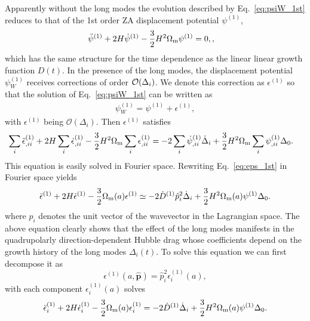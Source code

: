 \documentclass[a4paper,11pt]{article}
\newcommand{\vp}{{\bm p}}
\begin{document}
Apparently without the long modes the evolution described by Eq.~\eqref{eq:psiW_1st} reduces to
that of the 1st order ZA displacement potential $\psi^{(1)}$,
\begin{align}
    \ddot{\psi}^{(1)} + 2H\dot{\psi}^{(1)} - \frac{3}{2}H^2\Omega_{\rm m}\psi^{(1)} &= 0,
    \label{eq:psi_1st},
\end{align}
which has the same structure for the time dependence as the linear linear growth function $D(t)$.
In the presence of the long modes, the displacement potential $\psi^{(1)}_W$
receives corrections of order ${\cal O}(\Delta_i)$.
We denote this correction as $\epsilon^{(1)}$ so that the solution of Eq.~\eqref{eq:psiW_1st} can be written as 
\begin{align}
\psi_{W}^{(1)} = \psi^{(1)} + \epsilon^{(1)},
\end{align}
with $\epsilon^{(1)}$ being $\mathcal{O}(\Delta_i)$.
Then $\epsilon^{(1)}$ satisfies
\begin{align}
    \sum_i \ddot{\epsilon}^{(1)}_{,ii} + 2H\sum_i \dot{\epsilon}^{(1)}_{,ii} - \frac{3}{2}H^2\Omega_{\rm m}\sum_i \epsilon^{(1)}_{,ii} &= -2\sum_i \dot{\psi}_{,ii}^{(1)}\dot{\Delta}_i 
    + \frac{3}{2}H^2\Omega_{\rm m}\sum_i \psi_{,ii}^{(1)}\Delta_0.
    \label{eq:eps_1st}
\end{align}
This equation is easily solved in Fourier space.
Rewriting Eq.~\eqref{eq:eps_1st} in Fourier space yields
\begin{equation}
    \ddot \epsilon^{(1)} +2H \dot \epsilon^{(1)}
    - \frac32 \Omega_{\rm m}(a) \epsilon^{(1)}
    \simeq
    - 2\dot D^{(1)} \hat p_i^2 \dot \Delta_i + \frac32 H^2 \Omega_{\rm m}(a) \psi^{(1)} \Delta_0.
\end{equation}
where $\hat p_i$ denotes the unit vector of the wavevector
in the Lagrangian space.
The above equation clearly shows that the effect of the long modes manifests in the quadrupolarly
direction-dependent Hubble drag whose coefficients depend on the growth
history of the long modes $\Delta_i(t)$.
To solve this equation we can first decompose it as
\begin{equation}
    \epsilon^{(1)}(a, \hat{\vp}) = \hat p_i^2 \epsilon^{(1)}_i(a),
    \label{e}
\end{equation}
with each component $\epsilon^{(1)}_i(a)$ solves
\begin{equation}
    \ddot \epsilon_i^{(1)} + 2H \dot \epsilon_i^{(1)}
    - \frac32 \Omega_{\rm m}(a)\epsilon_i^{(1)}
    = - 2 \dot D^{(1)} \dot \Delta_i + \frac32 H^2\Omega_{\rm m}(a) \psi^{(1)} \Delta_0.
    \label{eq:ei}
\end{equation}
\end{document}
